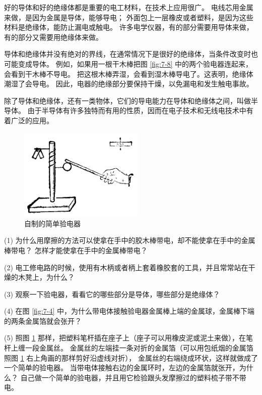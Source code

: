 好的导体和好的绝缘体都是重要的电工材料，在技术上应用很广。
电线芯用金属来做，是因为金属是导体，能够导电；
外面包上一层橡皮或者塑料，是因为这些材料是绝缘体，能防止漏电或触电。
许多电学仪器，有的部分需要用导体来做，有的部分又需要用绝缘体来做。

导体和绝缘体并没有绝对的界线，在通常情况下是很好的绝缘体，当条件改变时也可能变成导体。
例如，如果用一根干木棒把图 \ref{fig:7-8} 中的两个验电器连起来，会看到干木棒不导电。
把这根木棒弄湿，会看到湿木棒导电了。这表明，绝缘体潮湿了会导电。
因此，电器的绝缘部分要保持干燥，以免漏电和发生触电事故。

除了导体和绝缘体，还有一类物体，它们的导电能力在导体和绝缘体之间，叫做半导体。
由于半导体有许多独特而有用的性质，因而在电子技术和无线电技术中有着广泛的应用。


\lianxi

\begin{figure}
    \centering
    \includegraphics[width=6cm]{../pic/czwl2-ch7-9}
    \caption{自制的简单验电器}\label{fig:7-9}
\end{figure}

(1) 为什么用摩擦的方法可以使拿在手中的胶木棒带电，却不能使拿在手中的金属棒带电？
怎样才能使拿在手中的金属棒带电？

(2) 电工修电路的时候，使用有木柄或者柄上套着橡胶套的工具，并且常常站在干燥的木凳上，为什么？

(3) 观察一下验电器，看看它的哪些部分是导体，哪些部分是绝缘体？

(4) 在图 \ref{fig:7-4} 中，为什么带电体接触验电器金属棒上端的金属球，金属棒下端的两条金属箔就会张开？

(5) 照图 \ref{fig:7-9} 那样，把塑料笔杆插在座子上（座子可以用橡皮泥或泥土来做），在笔杆上缠一段金属丝。
金属丝的左端挂一条对折的金属箔（可以用包纸烟的金属箔照图 \ref{fig:7-9} 右上角画的那样剪好沿虚线对折），
金属丝的右端绕成环状，这样就做成了一个简单的验电器。
当带电体接触右边的金属环时，左边的金属箔就张开，为什么？
自己做一个简单的验电器，并且用它检验跟头发摩擦过的塑料梳子带不带电。

